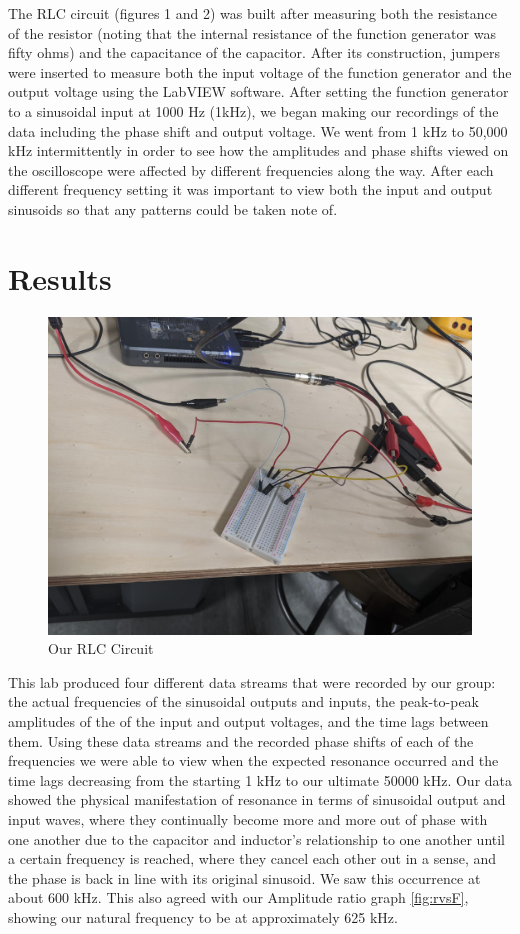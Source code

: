 \documentclass[10pt,twocolumn]{article}
\begin{document}
The RLC circuit (figures 1 and 2) was built after measuring both the resistance of the resistor (noting that the internal resistance of the function generator was fifty ohms) and the capacitance of the capacitor. After its construction, jumpers were inserted to measure both the input voltage of the function generator and the output voltage using the LabVIEW software. After setting the function generator to a sinusoidal input at 1000 Hz (1kHz), we began making our recordings of the data including the phase shift and output voltage. We went from 1 kHz to 50,000 kHz intermittently in order to see how the amplitudes and phase shifts viewed on the oscilloscope were affected by different frequencies along the way. After each different frequency setting it was important to view both the input and output sinusoids so that any patterns could be taken note of.  


\section{Results}
\label{sec:results}

\begin{figure}[bt]
	\centering
	\includegraphics[width=.9\linewidth]{figures/RLCcircuit.PNG}
	\caption{Our RLC Circuit}
	\label{fig:diagram2}
\end{figure}

This lab produced four different data streams that were recorded by our group: the actual frequencies of the sinusoidal outputs and inputs, the peak-to-peak amplitudes of the of the input and output voltages, and the time lags between them. Using these data streams and the recorded phase shifts of each of the frequencies we were able to view when the expected resonance occurred and the time lags decreasing from the starting 1 kHz to our ultimate 50000 kHz. Our data showed the physical manifestation of resonance in terms of sinusoidal output and input waves, where they continually become more and more out of phase with one another due to the capacitor and inductor’s relationship to one another until a certain frequency is reached, where they cancel each other out in a sense, and the phase is back in line with its original sinusoid. We saw this occurrence at about 600 kHz. This also agreed with our Amplitude ratio graph \autoref{fig:rvsF}, showing our natural frequency to be at approximately 625 kHz.
\end{document}
